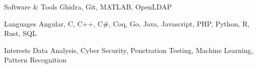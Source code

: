 
\begin{cvskills}
  \cvskill
    {Software \& Tools}
    {Ghidra, Git, MATLAB, OpenLDAP}

  \cvskill
    {Languages}
    {Angular, C, C++, C\#, Coq, Go, Java, Javascript, PHP, Python, R, Rust, SQL}

  \cvskill
    {Interests}
    {Data Analysis, Cyber Security, Penetration Testing, Machine Learning, Pattern Recognition}
\end{cvskills}
